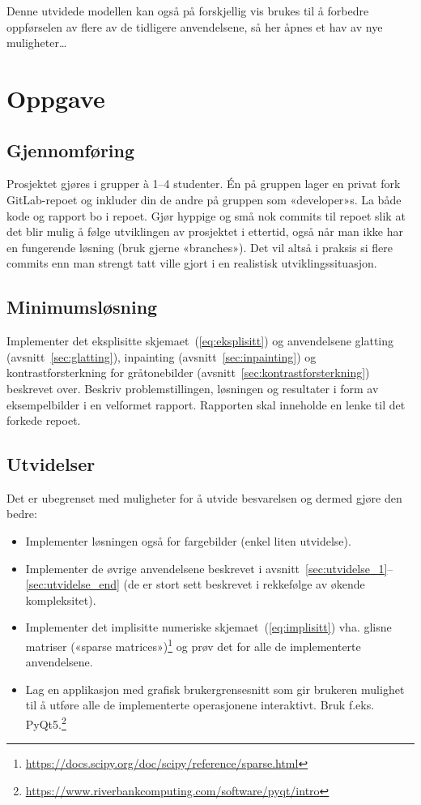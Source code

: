 \documentclass[11pt,a4paper]{article}
\begin{document}
Denne utvidede modellen kan også på forskjellig vis brukes til å forbedre oppførselen av flere av de tidligere anvendelsene, så her åpnes et hav av nye muligheter\dots

\section{Oppgave}

\subsection{Gjennomføring}

Prosjektet gjøres i grupper à 1–4 studenter. Én på gruppen lager en privat fork GitLab-repoet og inkluder din de andre på gruppen som «developer»s. La både kode og rapport bo i repoet. Gjør hyppige og små nok commits til repoet slik at det blir mulig å følge utviklingen av prosjektet i ettertid, også når man ikke har en fungerende løsning (bruk gjerne «branches»). Det vil altså i praksis si flere commits enn man strengt tatt ville gjort i en realistisk utviklingssituasjon.

\subsection{Minimumsløsning}

Implementer det eksplisitte skjemaet~(\ref{eq:eksplisitt}) og anvendelsene glatting (avsnitt~\ref{sec:glatting}), inpainting (avsnitt~\ref{sec:inpainting}) og kontrastforsterkning for gråtonebilder (avsnitt~\ref{sec:kontrastforsterkning}) beskrevet over. Beskriv problemstillingen, løsningen og resultater i form av eksempelbilder i en velformet rapport. Rapporten skal inneholde en lenke til det forkede repoet.

\subsection{Utvidelser}

Det er ubegrenset med muligheter for å utvide besvarelsen og dermed gjøre den bedre:
\begin{itemize}[noitemsep]
\item Implementer løsningen også for fargebilder (enkel liten   utvidelse).
\item Implementer de øvrige anvendelsene beskrevet i avsnitt~\ref{sec:utvidelse_1}--\ref{sec:utvidelse_end} (de er   stort sett beskrevet i rekkefølge av økende kompleksitet).
\item Implementer det implisitte numeriske skjemaet~(\ref{eq:implisitt}) vha. glisne matriser («sparse   matrices»)\footnote{\url{https://docs.scipy.org/doc/scipy/reference/sparse.html}} og prøv det for alle de implementerte anvendelsene.
\item Lag en applikasjon med grafisk brukergrensesnitt som gir   brukeren mulighet til å utføre alle de implementerte operasjonene   interaktivt. Bruk f.eks.   PyQt5.\footnote{\url{https://www.riverbankcomputing.com/software/pyqt/intro}}
\end{itemize}
\end{document}
